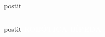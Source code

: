 \begin{frame}[label=resumen]
\begin{center}
{\begin{columns}[c]
\begin{column}{3cm}
\begin{beamercolorbox}[sep=0.5em,wd=3cm,rounded=true,center,shadow=true]{postit}
          \end{beamercolorbox}
        \end{column}
      \end{columns}
      \vspace{-4.6cm}
      \hspace{-0.25cm}
      \begin{beamercolorbox}[sep=0.5em,wd=4.0cm,rounded=true,center]{postit}
        \textbf{\Large\textcolor{white}{ROB\'OTICA B\'IPEDA}}
      \end{beamercolorbox}
    }
  \end{center}
\end{frame}
